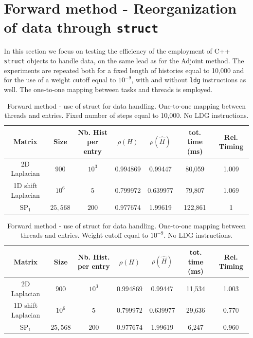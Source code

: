 \documentclass[a4paper,10pt]{article}
\begin{document}
\section{Forward method - Reorganization of data through \texttt{struct}}
In this section we focus on testing the efficiency of the employment of C++ 
\texttt{struct} objects to handle data, on the same lead as for the Adjoint 
method.
The experiments are repeated both for a fixed length of histories equal to 
10,000 and for the use of a weight cutoff equal to $10^{-9}$, with and without 
\texttt{ldg} instructions as well. The one-to-one mapping between 
tasks and threads is employed.


\begin{table}[!h]
\hspace*{-1cm}
\begin{tabular}{|c|c|c|c|c|c|c|}
\hline
\textbf{Matrix} & \textbf{Size} &\textbf{Nb. Hist per entry} & $\rho(H)$ 
& $\rho(\hat{H})$ & tot. time (ms) & Rel. Timing\\
\hline
2D Laplacian& $900$ & $10^3$ & 0.994869 & 0.99447 & 80,059 & 1.009\\
\hline 
1D shift Laplacian& $10^6$ & $5$ & 0.799972 & 0.639977 & 79,807 & 1.069\\
\hline
$\text{SP}_1$ & $25,568$ & $200$ & 0.977674 & 1.99619 & 122,861 & 1\\
\hline
\end{tabular}
\caption{Forward method - use of struct for data handling. One-to-one mapping 
between threads and entries. 
Fixed number of steps equal to 10,000. No LDG instructions.}
\label{tab28}
\end{table}


\begin{table}[!h]
\hspace*{-1cm}
\begin{tabular}{|c|c|c|c|c|c|c|}
\hline
\textbf{Matrix} & \textbf{Size} &\textbf{Nb. Hist. per entry} & $\rho(H)$ 
& $\rho(\hat{H})$ & tot. time (ms) & Rel. Timing\\
\hline
2D Laplacian& $900$ & $10^3$ & 0.994869 & 0.99447 & 11,534 & 1.003\\
\hline 
1D shift Laplacian& $10^6$ & $5$ & 0.799972 & 0.639977 & 29,636 & 0.770\\
\hline
$\text{SP}_1$ & $25,568$ & $200$ & 0.977674 & 1.99619 & 6,247 & 0.960\\
\hline
\end{tabular}
\caption{Forward method - use of struct for data handling. One-to-one mapping 
between threads and entries. 
Weight cutoff equal to $10^{-9}$. No LDG instructions.}
\label{tab29}
\end{table}
\end{document}
